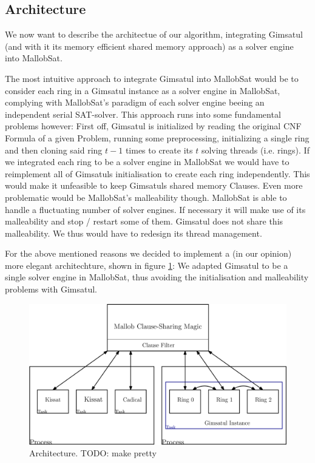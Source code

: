 \documentclass[12pt,a4paper,twoside]{scrartcl}
\numberwithin{equation}{section}
\begin{document}
\subsection{Architecture}

We now want to describe the architectue of our algorithm, integrating Gimsatul (and with it its memory efficient shared memory approach) as a solver engine into MallobSat.

The most intuitive approach to integrate Gimsatul into MallobSat would be to consider each ring in a Gimsatul instance as a solver engine in MallobSat, complying with MallobSat's paradigm of each solver engine beeing an independent serial SAT-solver. This approach runs into some fundamental problems however: 
First off, Gimsatul is initialized by reading the original CNF Formula of a given Problem, running some preprocessing, initializing a single ring and then cloning said ring $t - 1$ times to create its $t$ solving threads (i.e. rings). If we integrated each ring to be a solver engine in MallobSat we would have to reimplement all of Gimsatuls initialisation to create each ring independently. This would make it unfeasible to keep Gimsatuls shared memory Clauses.
Even more problematic would be MallobSat's malleability though. MallobSat is able to handle a fluctuating number of solver engines. If necessary it will make use of its malleability and stop / restart some of them. Gimsatul does not share this malleability. We thus would have to redesign its thread management.

For the above mentioned reasons we decided to implement a (in our opinion) more elegant architechture, shown in figure \ref{fig:architecture}: We adapted Gimsatul to be a single solver engine in MallobSat, thus avoiding the initialisation and malleability problems with Gimsatul.

\begin{figure}
  \center
  \includegraphics[scale=.2]{figures/architektur.png}
  \caption{Architecture. TODO: make pretty}
  \label{fig:architecture}
\end{figure}
\end{document}
